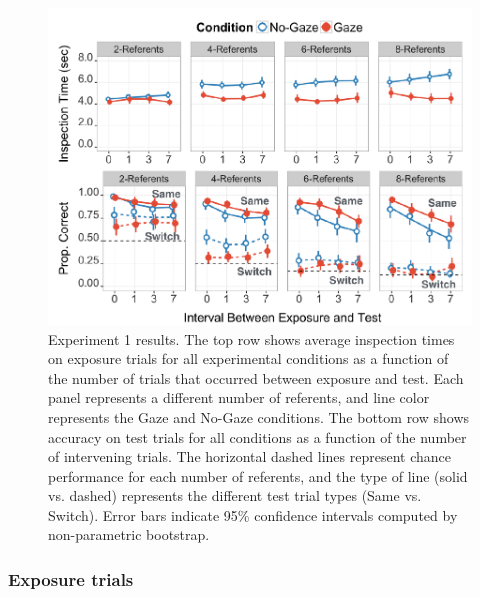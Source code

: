 \documentclass[authoryear, review]{elsarticle}
\newenvironment{CodeChunk}{}{}
\providecommand{\DIFaddbeginFL}{} %
\providecommand{\DIFaddendFL}{} %
\providecommand{\DIFdelbeginFL}{} %
\providecommand{\DIFdelendFL}{} %
\begin{document}
\begin{CodeChunk}
\begin{figure}[tb]

{\centering \DIFdelbeginFL %
\DIFdelendFL \DIFaddbeginFL \includegraphics[width=0.9\linewidth]{figs/expt1-plot-1} 
\DIFaddendFL 

}

\caption[Experiment 1 results]{Experiment 1 results. The top row shows average inspection times on exposure trials for all experimental conditions as a function of the number of trials that occurred between exposure and test. Each panel represents a different number of referents, and line color represents the Gaze and No-Gaze conditions. The bottom row shows accuracy on test trials for all conditions as a function of the number of intervening trials. The horizontal dashed lines represent chance performance for each number of referents, and the type of line (solid vs. dashed) represents the different test trial types (Same vs. Switch). Error bars indicate 95\% confidence intervals computed by non-parametric bootstrap.}\label{fig:expt1-plot}
\end{figure}
\end{CodeChunk}

\subsubsection{Exposure trials}\label{exposure-trials}
\end{document}

